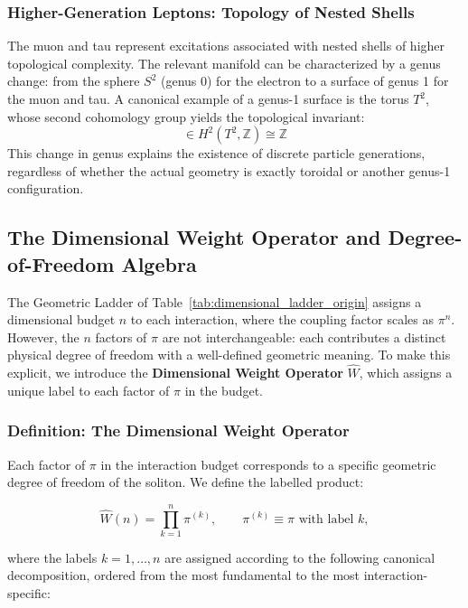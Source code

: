 \documentclass[10pt,a4paper]{article}
\begin{document}
\subsubsection{Higher-Generation Leptons: Topology of Nested Shells}
The muon and tau represent excitations associated with nested shells of higher topological complexity. The relevant manifold can be characterized by a genus change: from the sphere $S^2$ (genus 0) for the electron to a surface of genus 1 for the muon and tau. A canonical example of a genus-1 surface is the torus $T^2$, whose second cohomology group yields the topological invariant:
\begin{equation}
	[F] \in H^2(T^2, \mathbb{Z}) \cong \mathbb{Z}
\end{equation}
This change in genus explains the existence of discrete particle generations, regardless of whether the actual geometry is exactly toroidal or another genus-1 configuration.

\subsection{The Dimensional Weight Operator and Degree-of-Freedom Algebra}
\label{sec:dim_weight_operator}

The Geometric Ladder of Table~\ref{tab:dimensional_ladder_origin} assigns a 
dimensional budget $n$ to each interaction, where the coupling factor scales 
as $\pi^n$. However, the $n$ factors of $\pi$ are not interchangeable: each 
contributes a distinct physical degree of freedom with a well-defined geometric 
meaning. To make this explicit, we introduce the \textbf{Dimensional Weight 
	Operator} $\hat{W}$, which assigns a unique label to each factor of $\pi$ 
in the budget.

\subsubsection*{Definition: The Dimensional Weight Operator}

Each factor of $\pi$ in the interaction budget corresponds to a specific 
geometric degree of freedom of the soliton. We define the labelled product:

\begin{equation}
	\hat{W}(n) = \prod_{k=1}^{n} \pi^{(k)}, 
	\qquad \pi^{(k)} \equiv \pi \text{ with label } k,
	\label{eq:weight_operator}
\end{equation}

where the labels $k = 1, \ldots, n$ are assigned according to the following 
canonical decomposition, ordered from the most fundamental to the most 
interaction-specific:
\end{document}
